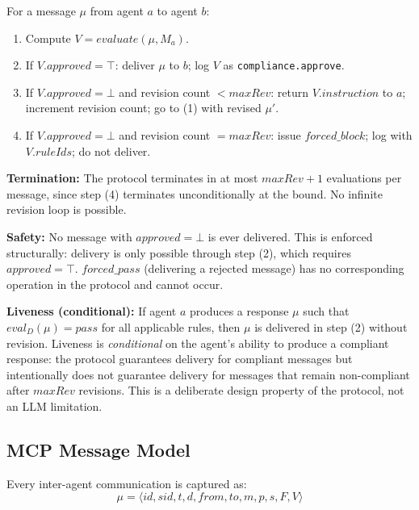 \documentclass[runningheads]{llncs}
\begin{document}
\begin{definition}
For a message $\mu$ from agent $a$ to agent $b$:
\begin{enumerate}
    \item Compute $V = \mathit{evaluate}(\mu, M_a)$.
    \item If $V.\mathit{approved} = \top$: deliver $\mu$ to $b$;
    log $V$ as \texttt{compliance.approve}.
    \item If $V.\mathit{approved} = \bot$ and revision count
    $< \mathit{maxRev}$: return $V.\mathit{instruction}$ to $a$;
    increment revision count; go to (1) with revised $\mu'$.
    \item If $V.\mathit{approved} = \bot$ and revision count
    $= \mathit{maxRev}$: issue $\mathit{forced\_block}$; log with
    $V.\mathit{ruleIds}$; do not deliver.
\end{enumerate}
\end{definition}

\textbf{Termination:} The protocol terminates in at most $\mathit{maxRev}
+ 1$ evaluations per message, since step (4) terminates unconditionally
at the bound. No infinite revision loop is possible.

\textbf{Safety:} No message with $\mathit{approved} = \bot$ is ever
delivered. This is enforced structurally: delivery is only possible
through step (2), which requires $\mathit{approved} = \top$.
$\mathit{forced\_pass}$ (delivering a rejected message) has no
corresponding operation in the protocol and cannot occur.

\textbf{Liveness (conditional):} If agent $a$ produces a response $\mu$
such that $\mathit{eval}_D(\mu) = \mathit{pass}$ for all applicable
rules, then $\mu$ is delivered in step (2) without revision. Liveness is
\emph{conditional} on the agent's ability to produce a compliant
response: the protocol guarantees delivery for compliant messages but
intentionally does not guarantee delivery for messages that remain
non-compliant after $\mathit{maxRev}$ revisions. This is a deliberate
design property of the protocol, not an LLM limitation.

\subsection{MCP Message Model}
\label{sec:mcp}

Every inter-agent communication is captured as:
\begin{equation}
\mu = \langle \mathit{id}, \mathit{sid}, t, d, \mathit{from},
    \mathit{to}, m, p, s, F, V \rangle
\end{equation}
\end{document}
